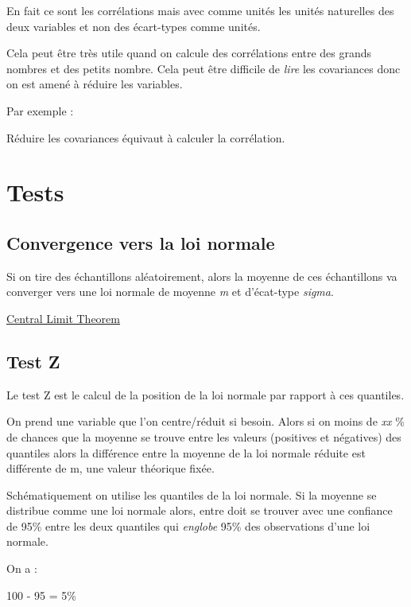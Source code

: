 \documentclass[
]{book}
\begin{document}
En fait ce sont les corrélations mais avec comme unités les unités naturelles
des deux variables et non des écart-types comme unités.

Cela peut être très utile quand on calcule des corrélations entre des grands
nombres et des petits nombre. Cela peut être difficile de \emph{lire} les covariances
donc on est amené à réduire les variables.

Par exemple :

Réduire les covariances équivaut à calculer la corrélation.

\hypertarget{tests}{%
\chapter{Tests}\label{tests}}

\hypertarget{convergence-vers-la-loi-normale}{%
\section{Convergence vers la loi normale}\label{convergence-vers-la-loi-normale}}

Si on tire des échantillons aléatoirement, alors la moyenne de ces échantillons
va converger vers une loi normale de moyenne \emph{m} et d'écat-type \emph{sigma}.

\href{https://datatrigger.shinyapps.io/CLT_Visualization/}{Central Limit Theorem}

\hypertarget{test-z}{%
\section{Test Z}\label{test-z}}

Le test Z est le calcul de la position de la loi normale par rapport à ces
quantiles.

On prend une variable que l'on centre/réduit si besoin. Alors si on moins de
\emph{xx} \% de chances que la moyenne se trouve entre les valeurs (positives et
négatives) des quantiles alors la différence entre la moyenne de la loi normale
réduite est différente de m, une valeur théorique fixée.

Schématiquement on utilise les quantiles de la loi normale. Si la moyenne se
distribue comme une loi normale alors, entre doit se trouver avec une confiance
de 95\% entre les deux quantiles qui \emph{englobe} 95\% des observations d'une loi
normale.

On a :

100 - 95 = 5\%
\end{document}
